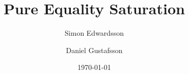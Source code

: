 \documentclass[leqno]{article}
\begin{document}
\title{Pure Equality Saturation}
\date{\today}
\author{Simon  Edwardsson
   \and Daniel Gustafsson
   }
\maketitle















\end{document}
